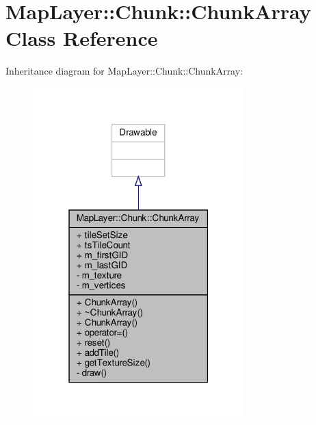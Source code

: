 \hypertarget{classMapLayer_1_1Chunk_1_1ChunkArray}{}\section{Map\+Layer\+:\+:Chunk\+:\+:Chunk\+Array Class Reference}
\label{classMapLayer_1_1Chunk_1_1ChunkArray}


Inheritance diagram for Map\+Layer\+:\+:Chunk\+:\+:Chunk\+Array\+:
\nopagebreak
\begin{figure}[H]
\begin{center}
\leavevmode
\includegraphics[width=232pt]{classMapLayer_1_1Chunk_1_1ChunkArray__inherit__graph}
\end{center}
\end{figure}


